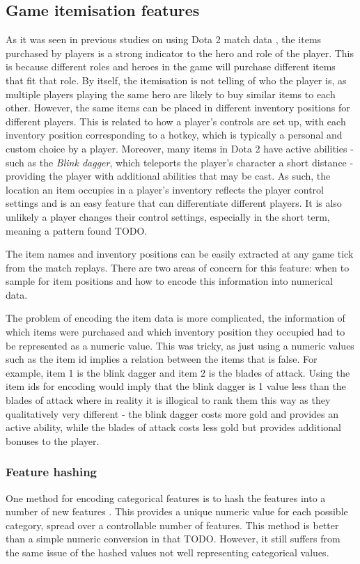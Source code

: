 \documentclass[Report.tex]{subfiles}
\begin{document}
\subsection{Game itemisation features}
As it was seen in previous studies on using Dota 2 match data \cite{dota-gao, dota-eggert}, the items purchased by players is a strong indicator to the hero and role of the player. This is because different roles and heroes in the game will purchase different items that fit that role. By itself, the itemisation is not telling of who the player is, as multiple players playing the same hero are likely to buy similar items to each other. However, the same items can be placed in different inventory positions for different players. This is related to how a player's controls are set up, with each inventory position corresponding to a hotkey, which is typically a personal and custom choice by a player. Moreover, many items in Dota 2 have active abilities - such as the \textit{Blink dagger}, which teleports the player's character a short distance - providing the player with additional abilities that may be cast. As such, the location an item occupies in a player's inventory reflects the player control settings and is an easy feature that can differentiate different players. It is also unlikely a player changes their control settings, especially in the short term, meaning a pattern found TODO. 

The item names and inventory positions can be easily extracted at any game tick from the match replays. There are two areas of concern for this feature: when to sample for item positions and how to encode this information into numerical data. 

The problem of encoding the item data is more complicated, the information of which items were purchased and which inventory position they occupied had to be represented as a numeric value. This was tricky, as just using a numeric values such as the item id implies a relation between the items that is false. For example, item 1 is the blink dagger and item 2 is the blades of attack. Using the item ids for encoding would imply that the blink dagger is 1 value less than the blades of attack where in reality it is illogical to rank them this way as they qualitatively very different - the blink dagger costs more gold and provides an active ability, while the blades of attack costs less gold but provides additional bonuses to the player. 


\subsubsection{Feature hashing}
One method for encoding categorical features is to hash the features into a number of new features \cite{feature-hashing}. This provides a unique numeric value for each possible category, spread over a controllable number of features. This method is better than a simple numeric conversion in that TODO. However, it still suffers from the same issue of the hashed values not well representing categorical values. 
\end{document}
